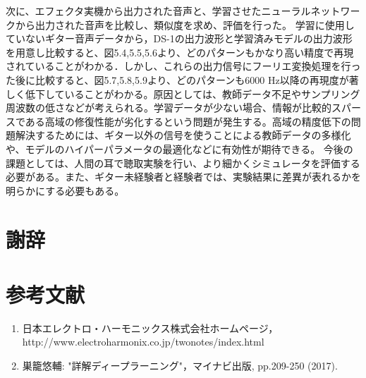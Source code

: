 \documentclass{jreport}		%
\begin{document}
次に、エフェクタ実機から出力された音声と、学習させたニューラルネットワークから出力された音声を比較し、類似度を求め、評価を行った。
学習に使用していないギター音声データから，DS-1の出力波形と学習済みモデルの出力波形を用意し比較すると、図5.4,5.5,5.6より、どのパターンもかなり高い精度で再現されていることがわかる．しかし、これらの出力信号にフーリエ変換処理を行った後に比較すると、図5.7,5.8,5.9より、どのパターンも6000 Hz以降の再現度が著しく低下していることがわかる。原因としては、教師データ不足やサンプリング周波数の低さなどが考えられる。学習データが少ない場合、情報が比較的スパースである高域の修復性能が劣化するという問題が発生する。高域の精度低下の問題解決するためには、ギター以外の信号を使うことによる教師データの多様化や、モデルのハイパーパラメータの最適化などに有効性が期待できる。
今後の課題としては、人間の耳で聴取実験を行い、より細かくシミュレータを評価する必要がある。また、ギター未経験者と経験者では、実験結果に差異が表れるかを明らかにする必要もある。

\chapter*{謝辞}

\chapter*{参考文献}
\begin{enumerate}
  \item 日本エレクトロ・ハーモニックス株式会社ホームページ，http://www.electroharmonix.co.jp/twonotes/index.html
  \item 巣籠悠輔: "詳解ディープラーニング"，マイナビ出版, pp.209-250 (2017).
\end{enumerate}
\end{document}
